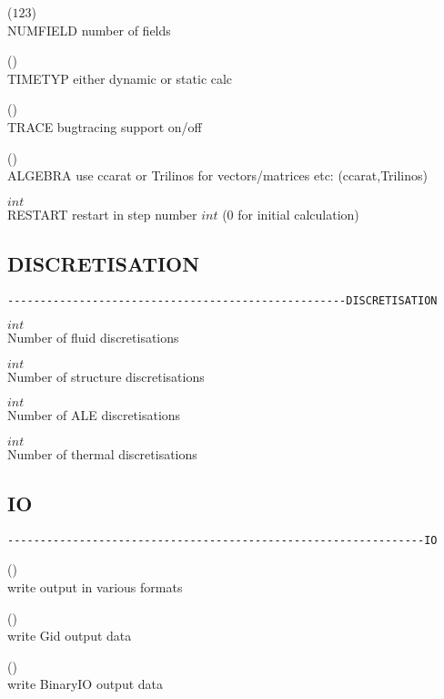  ($1$\kor$2$\kor$3$)\\
NUMFIELD number of fields

 (\kor{})\\
TIMETYP either dynamic or static calc

 (\kor{})\\
TRACE bugtracing support on/off

 (\kor{})\\
ALGEBRA use ccarat or Trilinos for vectors/matrices etc: (ccarat,Trilinos)

 $int$\\
RESTART restart in step number $int$ (0 for initial calculation)

\subsection{DISCRETISATION}
\begin{verbatim}
----------------------------------------------------DISCRETISATION
\end{verbatim}

 $int$\\
Number of fluid discretisations

 $int$\\
Number of structure discretisations

 $int$\\    
Number of ALE discretisations

 $int$\\
Number of thermal discretisations

\subsection{IO}
\begin{verbatim}
----------------------------------------------------------------IO
\end{verbatim}

 (\kor{})\\
write output in various formats

 (\kor{})\\
write Gid output data

 (\kor{})\\
write BinaryIO output data

